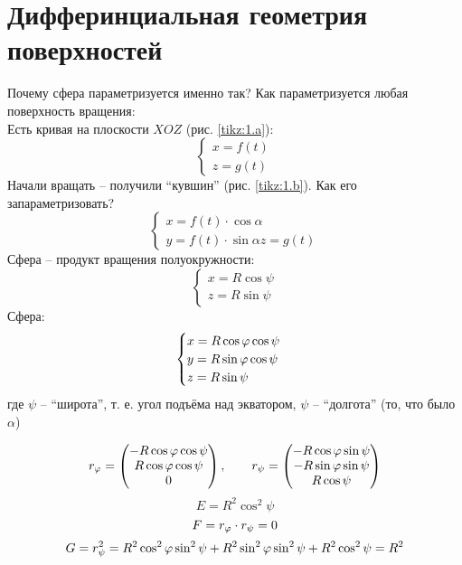 \chapter{Дифферинциальная геометрия поверхностей}

\begin{eg}[сфера]
	\hfill
	\begin{undefthm}{Почему сфера параметризуется именно так?}
		Как параметризуется любая поверхность вращения: \\
		Есть кривая на плоскости $ XOZ $ (рис. \ref{tikz:1.a}):
		$$
		\begin{cases}
			x = f(t) \\
			z = g(t)
		\end{cases} $$
		Начали вращать -- получили ``кувшин'' (рис. \ref{tikz:1.b}). Как его запараметризовать?
		$$
		\begin{cases}
			x = f(t) \cdot \cos \alpha \\
			y = f(t) \cdot \sin \alpha
			z = g(t)
		\end{cases} $$
		Сфера -- продукт вращения полуокружности:
		$$
		\begin{cases}
			x = R \cos \psi \\
			z = R \sin \psi
		\end{cases} $$
		Сфера:
		$$
		\begin{cases}
			x = R \cos \varphi \cos \psi \\
			y = R \sin \varphi \cos \psi \\
			z = R \sin \psi
		\end{cases} $$
		где $ \psi $ -- ``широта'', т. е. угол подъёма над экватором, $ \psi $ -- ``долгота'' (то, что было $ \alpha $)
	\end{undefthm}
	$$ r_\varphi =
	\begin{pmatrix}
		-R \cos \varphi \cos \psi \\
		R \cos \varphi \cos \psi \\
		0
	\end{pmatrix}, \qquad r_\psi =
	\begin{pmatrix}
		-R \cos \varphi \sin \psi \\
		-R \sin \varphi \sin \psi \\
		R \cos \psi
	\end{pmatrix} $$
	$$ E = R^2 \cos^2 \psi $$
	$$ F = r_\varphi \cdot r_\psi = 0 $$
	$$ G = r_\psi^2 = R^2 \cos^2 \varphi \sin^2 \psi + R^2 \sin^2 \varphi \sin^2 \psi + R^2 \cos^2 \psi = R^2 $$
\end{eg}

